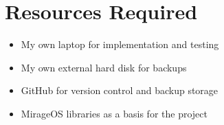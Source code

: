 \documentclass[12pt,a4paper,twoside]{article}
\begin{document}
\section*{Resources Required}

\begin{itemize}

	\item My own laptop for implementation and testing

	\item My own external hard disk for backups

	\item GitHub for version control and backup storage

	\item MirageOS libraries as a basis for the project

\end{itemize}
\end{document}
